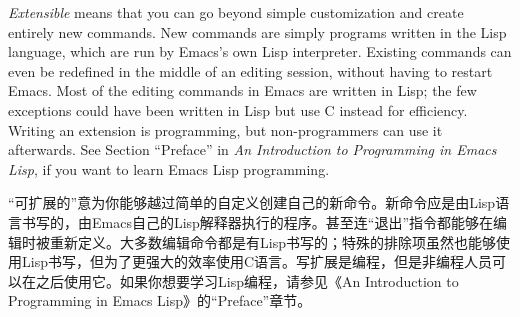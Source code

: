 \textit{Extensible} means that you can go beyond simple customization and create entirely new commands. New commands are simply programs written in the Lisp language, which are run by Emacs’s own Lisp interpreter. Existing commands can even be redefined in the middle of an editing session, without having to restart Emacs. Most of the editing commands in Emacs are written in Lisp; the few exceptions could have been written in Lisp but use C instead for efficiency. Writing an extension is programming, but non-programmers can use it afterwards. See Section “Preface” in \textit{An Introduction to Programming in Emacs Lisp}, if you want to learn Emacs Lisp programming.\par
“可扩展的”意为你能够越过简单的自定义创建自己的新命令。新命令应是由Lisp语言书写的，由Emacs自己的Lisp解释器执行的程序。甚至连“退出”指令都能够在编辑时被重新定义。大多数编辑命令都是有Lisp书写的；特殊的排除项虽然也能够使用Lisp书写，但为了更强大的效率使用C语言。写扩展是编程，但是非编程人员可以在之后使用它。如果你想要学习Lisp编程，请参见《An Introduction to Programming in Emacs Lisp》的“Preface”章节。